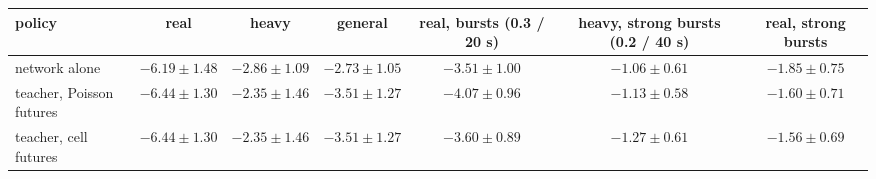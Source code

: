 \begin{tabular}{@{}lcccccc@{}}
\toprule
policy & real & heavy & general & real, bursts (0.3 / 20 s) & heavy, strong bursts (0.2 / 40 s) & real, strong bursts \\
\midrule
network alone & $-6.19 \pm 1.48$ & $-2.86 \pm 1.09$ & $-2.73 \pm 1.05$ & $-3.51 \pm 1.00$ & $-1.06 \pm 0.61$ & $-1.85 \pm 0.75$ \\
teacher, Poisson futures & $-6.44 \pm 1.30$ & $-2.35 \pm 1.46$ & $-3.51 \pm 1.27$ & $-4.07 \pm 0.96$ & $-1.13 \pm 0.58$ & $-1.60 \pm 0.71$ \\
teacher, cell futures & $-6.44 \pm 1.30$ & $-2.35 \pm 1.46$ & $-3.51 \pm 1.27$ & $-3.60 \pm 0.89$ & $-1.27 \pm 0.61$ & $-1.56 \pm 0.69$ \\
\bottomrule
\end{tabular}
